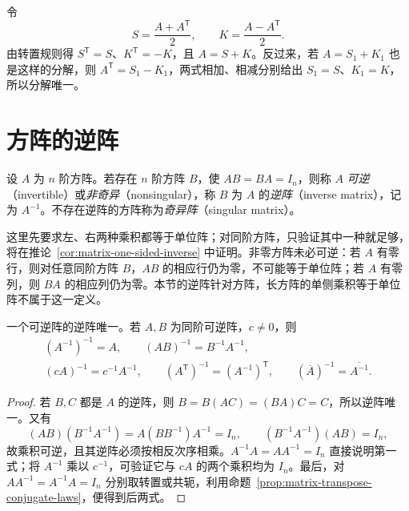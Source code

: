 \begin{solve}
令
\[
    S=\frac{A+A^{\mathsf T}}2,\qquad K=\frac{A-A^{\mathsf T}}2.
\]
由转置规则得 $S^{\mathsf T}=S$、$K^{\mathsf T}=-K$，且 $A=S+K$。反过来，若 $A=S_1+K_1$ 也是这样的分解，则 $A^{\mathsf T}=S_1-K_1$，两式相加、相减分别给出 $S_1=S$、$K_1=K$，所以分解唯一。
\end{solve}

\section{方阵的逆阵}
\label{sec:matrix-inverse}

\begin{definition}
\label{def:matrix-inverse}
设 $A$ 为 $n$ 阶方阵。若存在 $n$ 阶方阵 $B$，使 $AB=BA=I_n$，则称 $A$ \emph{可逆}（invertible）或\emph{非奇异}（nonsingular），称 $B$ 为 $A$ 的\emph{逆阵}（inverse matrix），记为 $A^{-1}$。不存在逆阵的方阵称为\emph{奇异阵}（singular matrix）。
\end{definition}

这里先要求左、右两种乘积都等于单位阵；对同阶方阵，只验证其中一种就足够，将在推论~\ref{cor:matrix-one-sided-inverse} 中证明。非零方阵未必可逆：若 $A$ 有零行，则对任意同阶方阵 $B$，$AB$ 的相应行仍为零，不可能等于单位阵；若 $A$ 有零列，则 $BA$ 的相应列仍为零。本节的逆阵针对方阵，长方阵的单侧乘积等于单位阵不属于这一定义。

\begin{proposition}[逆阵的唯一性与运算]
\label{prop:matrix-inverse-laws}
一个可逆阵的逆阵唯一。若 $A,B$ 为同阶可逆阵，$c\ne0$，则
\begin{equation}
\label{eq:matrix-inverse-laws}
    \begin{gathered}
        (A^{-1})^{-1}=A,\qquad (AB)^{-1}=B^{-1}A^{-1},\\
        (cA)^{-1}=c^{-1}A^{-1},\qquad
        (A^{\mathsf T})^{-1}=(A^{-1})^{\mathsf T},\qquad
        (\overline A)^{-1}=\overline{A^{-1}}.
    \end{gathered}
\end{equation}
\end{proposition}

\begin{proof}
若 $B,C$ 都是 $A$ 的逆阵，则 $B=B(AC)=(BA)C=C$，所以逆阵唯一。又有
\[
    (AB)(B^{-1}A^{-1})=A(BB^{-1})A^{-1}=I_n,
    \qquad
    (B^{-1}A^{-1})(AB)=I_n,
\]
故乘积可逆，且其逆阵必须按相反次序相乘。$A^{-1}A=AA^{-1}=I_n$ 直接说明第一式；将 $A^{-1}$ 乘以 $c^{-1}$，可验证它与 $cA$ 的两个乘积均为 $I_n$。最后，对 $AA^{-1}=A^{-1}A=I_n$ 分别取转置或共轭，利用命题~\ref{prop:matrix-transpose-conjugate-laws}，便得到后两式。
\end{proof}

